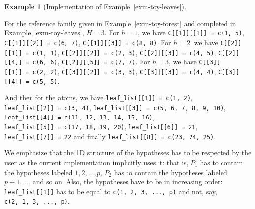 \documentclass[
  11pt,
  a4paper,
]{article}
\theoremstyle{plain}
\theoremstyle{definition}
\theoremstyle{plain}
\theoremstyle{definition}
\newtheorem{example}{Example}[section]
\theoremstyle{plain}
\theoremstyle{remark}
\newcounter{quartocalloutcauno}
\newcommand{\quartocalloutcau}[1]{\refstepcounter{quartocalloutcauno}\label{#1}}
\begin{document}
\begin{example}[Implementation of
Example~\ref{exm-toy-leaves}]\protect\hypertarget{exm-implementation}{}\label{exm-implementation}

For the reference family given in Example~\ref{exm-toy-forest} and
completed in Example~\ref{exm-toy-leaves}, \(H=3\). For \(h=1\), we have
\texttt{C{[}{[}1{]}{]}{[}{[}1{]}{]}\ =\ c(1,\ 5)},
\texttt{C{[}{[}1{]}{]}{[}{[}2{]}{]}\ =\ c(6,\ 7)},
\texttt{C{[}{[}1{]}{]}{[}{[}3{]}{]}\ =\ c(8,\ 8)}. For \(h=2\), we have
\texttt{C{[}{[}2{]}{]}{[}{[}1{]}{]}\ =\ c(1,\ 1)},
\texttt{C{[}{[}2{]}{]}{[}{[}2{]}{]}\ =\ c(2,\ 3)},
\texttt{C{[}{[}2{]}{]}{[}{[}3{]}{]}\ =\ c(4,\ 5)},
\texttt{C{[}{[}2{]}{]}{[}{[}4{]}{]}\ =\ c(6,\ 6)},
\texttt{C{[}{[}2{]}{]}{[}{[}5{]}{]}\ =\ c(7,\ 7)}. For \(h=3\), we have
\texttt{C{[}{[}3{]}{]}{[}{[}1{]}{]}\ =\ c(2,\ 2)},
\texttt{C{[}{[}3{]}{]}{[}{[}2{]}{]}\ =\ c(3,\ 3)},
\texttt{C{[}{[}3{]}{]}{[}{[}3{]}{]}\ =\ c(4,\ 4)},
\texttt{C{[}{[}3{]}{]}{[}{[}4{]}{]}\ =\ c(5,\ 5)}.

And then for the atoms, we have
\texttt{leaf\_list{[}{[}1{]}{]}\ =\ c(1,\ 2)},
\texttt{leaf\_list{[}{[}2{]}{]}\ =\ c(3,\ 4)},
\texttt{leaf\_list{[}{[}3{]}{]}\ =\ c(5,\ 6,\ 7,\ 8,\ 9,\ 10)},
\texttt{leaf\_list{[}{[}4{]}{]}\ =\ c(11,\ 12,\ 13,\ 14,\ 15,\ 16)},
\texttt{leaf\_list{[}{[}5{]}{]}\ =\ c(17,\ 18,\ 19,\ 20)},
\texttt{leaf\_list{[}{[}6{]}{]}\ =\ 21},
\texttt{leaf\_list{[}{[}7{]}{]}\ =\ 22} and finally
\texttt{leaf\_list{[}{[}8{]}{]}\ =\ c(23,\ 24,\ 25)}.

\end{example}

\begin{tcolorbox}[enhanced jigsaw, arc=.35mm, bottomrule=.15mm, bottomtitle=1mm, breakable, colback=white, colbacktitle=quarto-callout-caution-color!10!white, colframe=quarto-callout-caution-color-frame, coltitle=black, left=2mm, leftrule=.75mm, opacityback=0, opacitybacktitle=0.6, rightrule=.15mm, title=\textcolor{quarto-callout-caution-color}{\faFire}\hspace{0.5em}{Caution \ref*{cau-impl}}, titlerule=0mm, toprule=.15mm, toptitle=1mm]

\quartocalloutcau{cau-impl} 

We emphasize that the 1D structure of the hypotheses has to be respected
by the user as the current implementation implicitly uses it: that is,
\(P_1\) has to contain the hypotheses labeled \(1, 2, \dotsc, p\),
\(P_2\) has to contain the hypotheses labeled \(p+1, \dotsc\), and so
on. Also, the hypotheses have to be in increasing order:
\texttt{leaf\_list{[}{[}1{]}{]}} has to be equal to
\texttt{c(1,\ 2,\ 3,\ ...,\ p)} and not, say,
\texttt{c(2,\ 1,\ 3,\ ...,\ p)}.

\end{tcolorbox}
\end{document}
